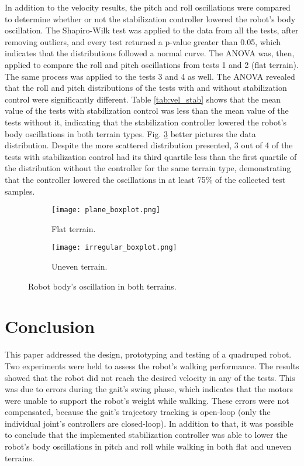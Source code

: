 \documentclass[conference]{IEEEtran}
\begin{document}
In addition to the velocity results, the pitch and roll oscillations were compared to determine whether or not the stabilization controller lowered the robot's body oscillation. The Shapiro-Wilk test was applied to the data from all the tests, after removing outliers, and every test returned a p-value greater than 0.05, which indicates that the distributions followed a normal curve. The ANOVA was, then, applied to compare the roll and pitch oscillations from tests 1 and 2 (flat terrain). The same process was applied to the tests 3 and 4 as well. The ANOVA revealed that the roll and pitch distributions of the tests with and without stabilization control were significantly different. Table \ref{tab:vel_stab} shows that the mean value of the tests with stabilization control was less than the mean value of the tests without it, indicating that the stabilization controller lowered the robot's body oscillations in both terrain types. Fig. \ref{fig:imu_test} better pictures the data distribution. Despite the more scattered distribution presented, 3 out of 4 of the tests with stabilization control had its third quartile less than the first quartile of the distribution without the controller for the same terrain type, demonstrating that the controller lowered the oscillations in at least 75\% of the collected test samples.

\begin{figure}[!tb]
  \centering
  \begin{subfigure}[t]{0.49\textwidth}
    \centering
    \texttt{[image: plane\_boxplot.png]}
    \caption{Flat terrain.}
    \label{fig:imu_test_plane}
  \end{subfigure}
  \begin{subfigure}[t]{0.49\textwidth}
    \centering
    \texttt{[image: irregular\_boxplot.png]}
    \caption{Uneven terrain.}
    \label{fig:imu_test_irregular}
  \end{subfigure}
  \caption{Robot body's oscillation in both terrains.}
  \label{fig:imu_test}
\end{figure}

\section{Conclusion} \label{conclusion}

This paper addressed the design, prototyping and testing of a quadruped robot. Two experiments were held to assess the robot's walking performance. The results showed that the robot did not reach the desired velocity in any of the tests. This was due to errors during the gait's swing phase, which indicates that the motors were unable to support the robot's weight while walking. These errors were not compensated, because the gait's trajectory tracking is open-loop (only the individual joint's controllers are closed-loop). In addition to that, it was possible to conclude that the implemented stabilization controller was able to lower the robot's body oscillations in pitch and roll while walking in both flat and uneven terrains.
\end{document}
